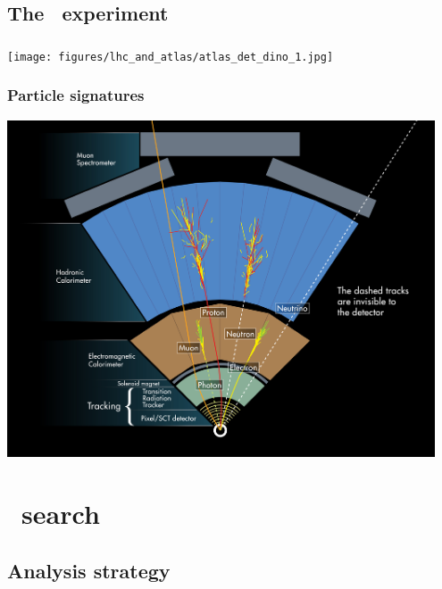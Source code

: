 \documentclass[10pt, svgnames]{beamer}
\begin{document}
\subsection{The \atlas\ experiment}

\begin{frame}
  \frametitle{\atlas}
  \begin{center}
    \texttt{[image: figures/lhc\_and\_atlas/atlas\_det\_dino\_1.jpg]}
  \end{center}
\end{frame}

\begin{frame}
  \frametitle{Particle signatures}
  \begin{center}
    \includegraphics[width=0.95\textwidth]
    {figures/lhc_and_atlas/particle_signatures.jpg}
  \end{center}
\end{frame}

\section{\BMINUSL\ search}
\subsection{Analysis strategy}
\end{document}
